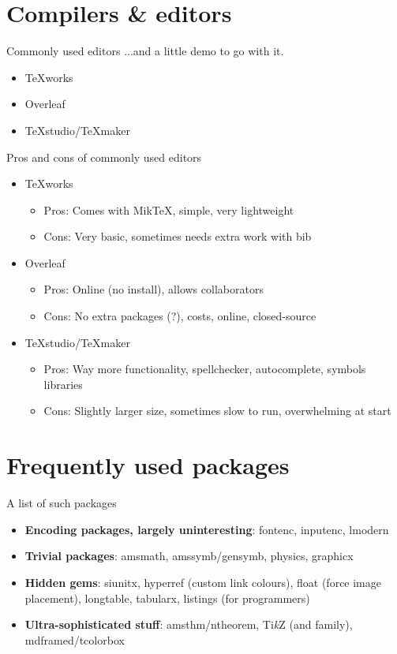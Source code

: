 \documentclass{beamer}
\theoremstyle{definition}
\theoremstyle{remark}
\begin{document}
\section{Compilers \& editors}
\begin{frame}{Commonly used editors}
...and a little demo to go with it.
\begin{itemize}
\item TeXworks
\item Overleaf
\item TeXstudio/TeXmaker
\end{itemize}
\end{frame}
\begin{frame}{Pros and cons of commonly used editors}
\begin{itemize}
\item TeXworks 
\begin{itemize}
\item Pros: Comes with MikTeX, simple, very lightweight
\item Cons: Very basic, sometimes needs extra work with bib
\end{itemize}
\item Overleaf
\begin{itemize}
\item Pros: Online (no install), allows collaborators
\item Cons: No extra packages (?), costs, online, closed-source
\end{itemize}
\item TeXstudio/TeXmaker
\begin{itemize}
\item Pros: Way more functionality, spellchecker, autocomplete, symbols libraries\footnotemark{}
\item Cons: Slightly larger size, sometimes slow to run, overwhelming at start
\end{itemize}
\end{itemize}
\end{frame}


\section{Frequently used packages}
\begin{frame}{A list of such packages}
\begin{itemize}
\item \textbf{Encoding packages, largely uninteresting}: fontenc, inputenc, lmodern
\item \textbf{Trivial packages}: amsmath, amssymb/gensymb, physics, graphicx
\item \textbf{Hidden gems}: siunitx, hyperref (custom link colours), float (force image placement), longtable, tabularx, listings (for programmers)
\item \textbf{Ultra-sophisticated stuff}: amsthm/ntheorem, Ti\textit{k}Z (and family), mdframed/tcolorbox
\end{itemize}
\end{frame}
\end{document}
